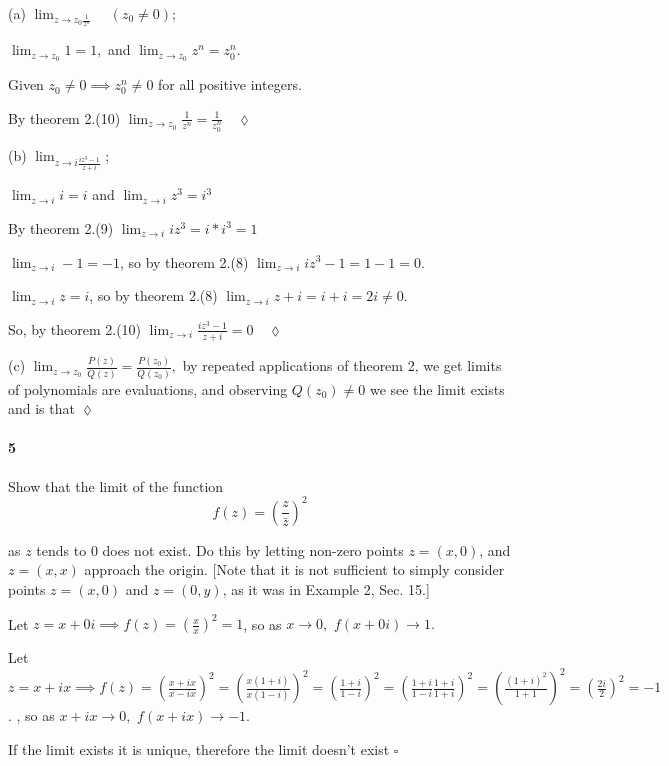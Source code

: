 \documentclass{article}
\begin{document}
(a) $\lim_{z\rightarrow z_0 \frac{1}{z^n}}\quad (z_0\neq 0)$;

$\lim_{z\rightarrow z_0} 1 = 1,$ and $\lim_{z\rightarrow z_0} z^n =
z_0^n$.

Given $z_0\neq 0 \implies z_0^n \neq 0$ for all positive integers.

By theorem 2.(10) $\lim_{z\rightarrow z_0} \frac{1}{z^n} =
\frac{1}{z_0^n}\quad \lozenge$

(b) $\lim_{z\rightarrow i \frac{iz^3 - 1}{z + i}}$;


$\lim_{z\rightarrow i} i = i$  and $\lim_{z\rightarrow i} z^3 = i^3$

By theorem 2.(9)  $\lim_{z\rightarrow i} iz^3 = i*i^3 = 1$

$\lim_{z\rightarrow i} -1 = -1$, so by theorem 2.(8)
$\lim_{z\rightarrow i} iz^3-1 = 1-1 = 0$.

$\lim_{z\rightarrow i} z = i$, so by theorem 2.(8) $\lim_{z\rightarrow
  i} z+i = i+i = 2i \neq 0$.

So, by theorem 2.(10) $\lim_{z\rightarrow i} \frac{iz^3 - 1}{z + i} =
0 \quad \lozenge$

(c) $\lim_{z\rightarrow z_0} \frac{P(z)}{Q(z)} =
\frac{P(z_0)}{Q(z_0)},$ by repeated applications of theorem 2, we get
limits of polynomials are evaluations, and
observing $Q(z_0)\neq 0$ we see the limit exists and is that $\lozenge$

\paragraph{5} Show that the limit of the function
\[f(z) = (\frac{z}{\bar{z}})^2\]

as $z$ tends to $0$ does not exist. Do this by letting non-zero points
$z = (x,0)$, and $z = (x,x)$ approach the origin. [Note that it is not sufficient to simply consider points
$z = (x, 0)$ and $z = (0, y)$, as it was in Example 2, Sec. 15.]


Let $z = x +0i \implies f(z) = (\frac{x}{x})^2 = 1$, so as
$x\rightarrow 0,$ $f(x+0i)\rightarrow 1.$

Let $z = x+ix \implies f(z) = (\frac{x+ix}{x-ix})^2=
(\frac{x(1+i)}{x(1-i)})^2= (\frac{1+i}{1-i})^2 =
(\frac{1+i}{1-i}\frac{1+i}{1+i})^2 = (\frac{(1+i)^2}{1+1})^2 =
(\frac{2i}{2})^2 = -1$.
, so as
$x+ix\rightarrow 0,$ $f(x+ix)\rightarrow -1.$

If the limit exists it is unique, therefore the limit doesn't exist
$\square$
\end{document}
